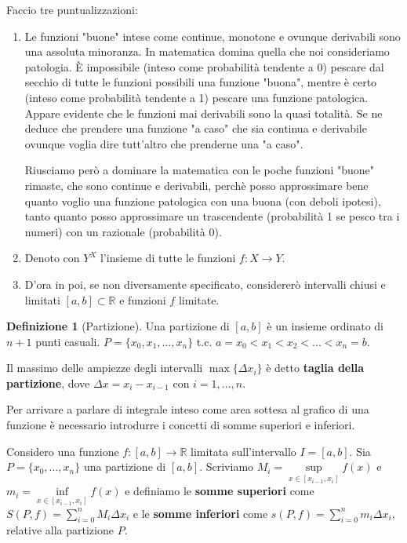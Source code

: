 \documentclass{article}
\theoremstyle{definition}
\theoremstyle{definition}
\theoremstyle{definition}
\newtheorem{definition}{Definizione}[section]
\theoremstyle{definition}
\theoremstyle{definition}
\begin{document}
Faccio tre puntualizzazioni:
\begin{enumerate}
    \item Le funzioni "buone" intese come continue, monotone e ovunque derivabili sono una assoluta minoranza. In matematica domina quella che noi consideriamo patologia. È impossibile (inteso come probabilità tendente a 0) pescare dal secchio di tutte le funzioni possibili una funzione "buona", mentre è certo (inteso come probabilità tendente a 1) pescare una funzione patologica. Appare evidente che le funzioni mai derivabili sono la quasi totalità. Se ne deduce che prendere una funzione "a caso" che sia continua e derivabile ovunque voglia dire tutt'altro che prenderne una "a caso". 
    
    Riusciamo però a dominare la matematica con le poche funzioni "buone" rimaste, che sono continue e derivabili, perchè posso approssimare bene quanto voglio una funzione patologica con una buona (con deboli ipotesi), tanto quanto posso approssimare un trascendente (probabilità 1 se pesco tra i numeri) con un razionale (probabilità 0).
    \item Denoto con $Y^{X}$ l'insieme di tutte le funzioni $f:X\rightarrow Y$.
    \item D'ora in poi, se non diversamente specificato, considererò intervalli chiusi e limitati $[a,b]\subset \mathbb{R}$ e funzioni $f$ limitate.
\end{enumerate}

\begin{definition}[Partizione]
    Una partizione di $[a,b]$ è un insieme ordinato di $n+1$ punti casuali. $P=\lbrace x_0,x_1, ...,x_n \rbrace$ t.c. $a=x_0 < x_1 < x_2 <...<x_n=b$.

    Il massimo delle ampiezze degli intervalli $\max\lbrace\Delta x_i\rbrace$ è detto \textbf{taglia della partizione}, dove $\Delta x= x_i - x_{i-1}$ con $i=1,... ,n$.
\end{definition}

Per arrivare a parlare di integrale inteso come area sottesa al grafico di una funzione è necessario introdurre i concetti di somme superiori e inferiori.

\vspace{5mm}

Considero una funzione $f:[a,b]\rightarrow \mathbb{R}$ limitata sull'intervallo $I=[a,b]$. Sia $P=\lbrace x_0,...,x_n \rbrace$ una partizione di $[a,b]$. Scriviamo $M_i=\underset{x\in [x_{i-1},x_i]}{\sup} f(x)$ e $m_i =\underset{x\in [x_{i-1},x_i]}{\inf} f(x)$ e definiamo le \textbf{somme superiori} come $S(P,f)=\displaystyle\sum_{i=0}^{n}M_i \Delta x_i$ e le \textbf{somme inferiori} come $s(P,f)=\displaystyle\sum_{i=0}^{n}m_i \Delta x_i$, relative alla partizione $P$.
\end{document}
